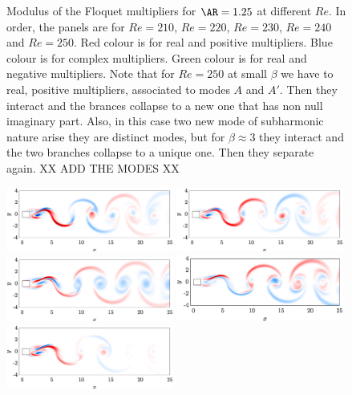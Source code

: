 \begin{figure}
  \caption{Modulus of the Floquet multipliers for $\AR=1.25$ at different $Re$. In order, the panels are for $Re=210$, $Re=220$, $Re=230$, $Re=240$ and $Re=250$. Red colour is for real and positive multipliers. Blue colour is for complex multipliers. Green colour is for real and negative multipliers. Note that for $Re=250$ at small $\beta$ we have to real, positive multipliers, associated to modes $A$ and $A'$. Then they interact and the brances collapse to a new one that has non null imaginary part. Also, in this case two new mode of subharmonic nature arise they are distinct modes, but for $\beta \approx 3$ they interact and the two branches collapse to a unique one. Then they separate again. XX ADD THE MODES XX}
\end{figure}

\begin{figure}
  \centering
  \includegraphics[width=0.49\textwidth]{./fig/AR1p25/omegax_Re230_beta_2p25_modeC.eps}
  \includegraphics[width=0.49\textwidth]{./fig/AR1p25/omegax_Re230_beta_2p25_modeD.eps}
  \includegraphics[width=0.49\textwidth]{./fig/AR1p25/omegax_Re240_beta_0p5_modeBpp.eps}
  \includegraphics[width=0.49\textwidth]{./fig/AR1p25/omegax_Re250_beta_1_modeAp.eps}
  \includegraphics[width=0.49\textwidth]{./fig/AR1p25/omegax_Re250_beta_3_modeS.eps}

\end{figure}
